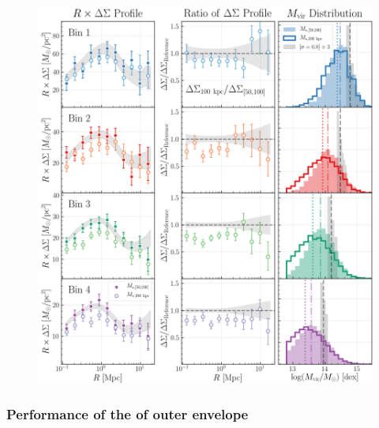 \documentclass[a4paper,fleqn,usenatbib]{mnras}
\begin{document}
  \begin{figure}
      \centering
      \includegraphics[width=\textwidth]{figure/topn_dsigma_m100_mout_compare}
      \caption{
          }
      \label{fig:m100_mout}
  \end{figure}

\subsubsection{Performance of the \mstar{} of outer envelope}
    \label{sec:moutskirt}
\end{document}
